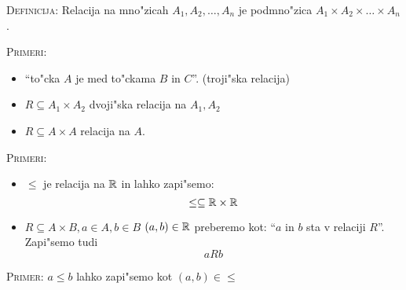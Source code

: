 \textsc{Definicija:} Relacija na mno"zicah $A_1, A_2, \ldots, A_n$ je podmno"zica $A_1 \times A_2 \times \ldots \times A_n$.

\textsc{Primeri:}
\begin{itemize}
	\item ``to"cka $A$ je med to"ckama $B$ in $C$''. (troji"ska relacija)
	\item $R \subseteq A_1 \times A_2$ dvoji"ska relacija na $A_1, A_2$
	\item $R \subseteq A \times A$ relacija na $A$.
\end{itemize}
\textsc{Primeri:}
\begin{itemize}
	\item  $\leq$ je relacija na $\mathbb{R}$ in lahko zapi"semo:
	\begin{equation*}
	\leq \subseteq \mathbb{R} \times \mathbb{R}
	\end{equation*}
	
	\item $R \subseteq A \times B, a \in A, b \in B$
	$(a, b) \in \mathbb{R}$ preberemo kot: ``$a$ in $b$ sta v relaciji $R$''. Zapi"semo tudi
	\begin{equation*}
	a R b
	\end{equation*}
\end{itemize}
\textsc{Primer:} $a \leq b$ lahko zapi"semo kot $(a, b) \in \leq$

